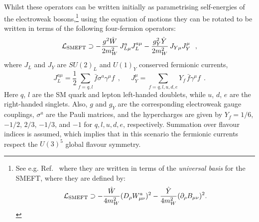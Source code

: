 \documentclass[withindex,glossary]{cam-thesis}
\begin{document}
Whilst these operators can be written initially as parametrising self-energies of the 
electroweak bosons,\footnote{See e.g. Ref.~\cite{Englert:2019zmt} where they are written in terms of the \textit{universal basis} for the SMEFT, where they are defined by:
\begin{equation*}
\label{eq:WY}
\mathcal{L}_{\rm SMEFT} \supset -\frac{\hat{W}}{4 m_W^2} (D_\rho W^a_{\mu\nu})^2 -\frac{\hat{Y}}{4 m_W^2} (\partial_\rho B_{\mu\nu})^2.
\end{equation*}
} using the equation of motions they can be rotated to be written in terms of the following four-fermion operators:
\begin{equation} \label{eq:JJ}
\mathcal{L}_{\rm SMEFT} \supset -\frac{g^2 \hat{W}}{2 m_W^2} \, J^{a}_{L \mu} J^{a \mu}_L -\frac{ g_Y^2 \hat{Y} }{2 m_W^2} \, J_{Y \mu} J^\mu_Y ~~,
\end{equation}
where $J_L$ and $J_Y$ are $SU(2)_L$ and $U(1)_Y$ conserved fermionic currents,
\begin{equation}
J^{a \mu}_L =  \frac{1}{2} \sum_{f = q, l}  \bar f \sigma^a \gamma^\mu f ~~,\quad ~~ J^\mu_Y= \sum_{f = q, l, u, d, e}  Y_f\,\bar f \gamma^\mu f~~.
\end{equation}
Here $q$, $l$ are the SM quark and lepton left-handed doublets, while $u$, $d$, $e$ are 
the right-handed singlets. Also, $g$ and $g_Y$ are the corresponding electroweak gauge couplings,
$\sigma^a$ are the Pauli matrices, and the hypercharges are given by $Y_f = 1/6$, $-1/2$, $2/3$, $-1/3$, and $-1$ for $q,l,u,d,e$, respectively. Summation over flavour indices is assumed, which implies
that in this scenario the fermionic currents respect the $U(3)^5$
global flavour symmetry.
\end{document}
